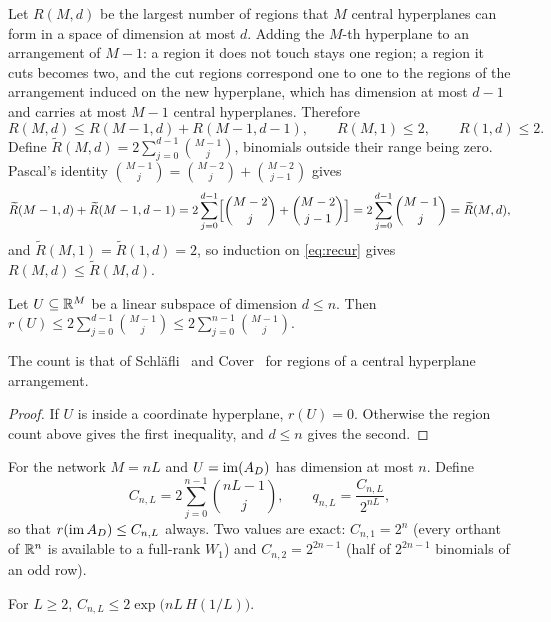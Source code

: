 Let $R(M,d)$ be the largest number of regions that $M$ central hyperplanes can form in a space of dimension at most $d$. Adding the $M$-th hyperplane to an arrangement of $M-1$: a region it does not touch stays one region; a region it cuts becomes two, and the cut regions correspond one to one to the regions of the arrangement induced on the new hyperplane, which has dimension at most $d-1$ and carries at most $M-1$ central hyperplanes. Therefore
\begin{equation}\label{eq:recur}
R(M,d)\le R(M-1,d)+R(M-1,d-1),\qquad R(M,1)\le 2,\qquad R(1,d)\le 2 .
\end{equation}
Define $\widetilde R(M,d)=2\sum_{j=0}^{d-1}\binom{M-1}{j}$, binomials outside their range being zero. Pascal's identity $\binom{M-1}{j}=\binom{M-2}{j}+\binom{M-2}{j-1}$ gives
\[
\widetilde R(M-1,d)+\widetilde R(M-1,d-1)=2\sum_{j=0}^{d-1}\Bigl[\binom{M-2}{j}+\binom{M-2}{j-1}\Bigr]=2\sum_{j=0}^{d-1}\binom{M-1}{j}=\widetilde R(M,d),
\]
and $\widetilde R(M,1)=\widetilde R(1,d)=2$, so induction on \cref{eq:recur} gives $R(M,d)\le\widetilde R(M,d)$.

\begin{lemma}\label{lem:cover}
Let $U\subseteq\mathbb{R}^M$ be a linear subspace of dimension $d\le n$. Then $r(U)\le 2\sum_{j=0}^{d-1}\binom{M-1}{j}\le 2\sum_{j=0}^{n-1}\binom{M-1}{j}$.
\end{lemma}
The count is that of Schl\"afli~\cite{schlafli} and Cover~\cite{cover} for regions of a central hyperplane arrangement.

\begin{proof}
If $U$ is inside a coordinate hyperplane, $r(U)=0$. Otherwise the region count above gives the first inequality, and $d\le n$ gives the second.
\end{proof}

For the network $M=nL$ and $U=\operatorname{im}(A_D)$ has dimension at most $n$. Define
\begin{equation}\label{eq:CnL}
C_{n,L}=2\sum_{j=0}^{n-1}\binom{nL-1}{j},\qquad q_{n,L}=\frac{C_{n,L}}{2^{nL}},
\end{equation}
so that $r(\operatorname{im} A_D)\le C_{n,L}$ always. Two values are exact: $C_{n,1}=2^n$ (every orthant of $\mathbb{R}^n$ is available to a full-rank $W_1$) and $C_{n,2}=2^{2n-1}$ (half of $2^{2n-1}$ binomials of an odd row).

\begin{lemma}\label{lem:C-entropy}
For $L\ge 2$, $C_{n,L}\le 2\exp\bigl(nL\,H(1/L)\bigr)$.
\end{lemma}


